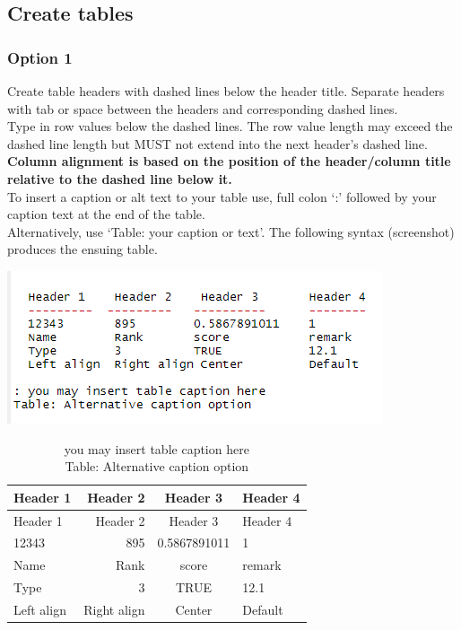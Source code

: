 \documentclass[
]{book}
\let\origfigure\figure
\let\endorigfigure\endfigure
\renewenvironment{figure}[1][2] {
    \expandafter\origfigure\expandafter[H]
} {
    \endorigfigure
}
\begin{document}
\hypertarget{create-tables}{%
\subsection{Create tables}\label{create-tables}}

\hypertarget{option-1}{%
\subsubsection{Option 1}\label{option-1}}

Create table headers with dashed lines below the header title. Separate headers with tab or space between the headers and corresponding dashed lines.\\
Type in row values below the dashed lines. The row value length may exceed the dashed line length but MUST not extend into the next header's dashed line.\\
\textbf{Column alignment is based on the position of the header/column title relative to the dashed line below it.}\\
To insert a caption or alt text to your table use, full colon `:' followed by your caption text at the end of the table.\\
Alternatively, use `Table: your caption or text'. The following syntax (screenshot) produces the ensuing table.

\begin{figure}
\centering
\includegraphics{tutorial_screenshots/typed_table.png}
\caption{manual table}
\end{figure}

\begin{longtable}[]{@{}lrcl@{}}
\caption{you may insert table caption here\\
Table: Alternative caption option}\tabularnewline
\toprule
Header 1 & Header 2 & Header 3 & Header 4 \\
\midrule
\endfirsthead
\toprule
Header 1 & Header 2 & Header 3 & Header 4 \\
\midrule
\endhead
12343 & 895 & 0.5867891011 & 1 \\
Name & Rank & score & remark \\
Type & 3 & TRUE & 12.1 \\
Left align & Right align & Center & Default \\
\bottomrule
\end{longtable}
\end{document}
